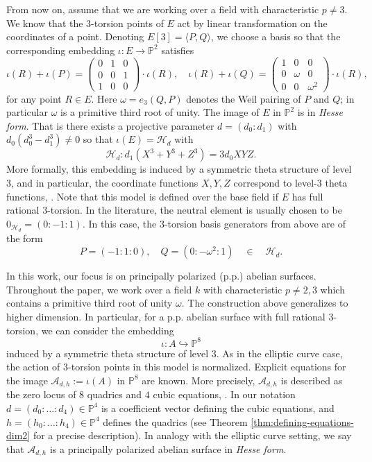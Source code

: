 \documentclass[11pt]{amsart}
\theoremstyle{definition}
\newcommand{\A}{\mathcal{A}}
\renewcommand{\H}{\mathcal{H}}
\newcommand{\HH}{\mathcal{H}}
\let \H\HH
\newcommand{\PP}{\mathbb{P}}
\begin{document}
From now on, assume that we are working over a field with characteristic $p \neq 3$.
We know that the $3$-torsion points of $E$ act by linear transformation on the coordinates of a point. Denoting $E[3] = \langle P, Q\rangle$, we choose a basis so that the corresponding embedding $\iota: E \to \PP^2$ satisfies
\[
\iota(R) + \iota(P) = \begin{pmatrix} 0 & 1 & 0\\ 0&0&1\\ 1&0&0 \end{pmatrix} \cdot \iota(R),\quad 
\iota(R) + \iota(Q) = \begin{pmatrix} 1 & 0 & 0\\ 0&\omega&0\\ 0&0&\omega^2 \end{pmatrix} \cdot \iota(R),
\]
for any point $R \in E$. Here $\omega = e_3(Q,P)$ denotes the Weil pairing of $P$ and $Q$; in particular $\omega$ is a primitive third root of unity. The image of $E$ in $\PP^2$ is in {\em Hesse form}. That is there exists a projective parameter $d = (d_0:d_1)$ with $d_0(d_0^3-d_1^3) \neq 0$ so that $\iota(E) = \H_d$ with
\begin{equation} \label{eq:ell-hesse}
    \H_d: d_1(X^3 + Y^3 + Z^3) = 3d_0 XYZ.
\end{equation}
More formally, this embedding is induced by a symmetric theta structure of level $3$, and in particular, the coordinate functions $X,Y,Z$ correspond to level-$3$ theta functions, \cite[Section 5, Case (b)]{mumford1966equations}. Note that this model is defined over the base field if $E$ has full rational $3$-torsion. In the literature, the neutral element is usually chosen to be $0_{\H_d} = (0:-1:1)$. In this case, the $3$-torsion basis generators from above are of the form
\begin{equation} \label{eq:ell-hesse-torsion}
    P = (-1: 1 :0) ,\quad  Q = (0: -\omega^2 : 1) \quad \in \quad \H_{d}.
\end{equation}

In this work, our focus is on principally polarized (p.p.) abelian surfaces. Throughout the paper, we work over a field $k$ with characteristic $p\neq 2,3$ which contains a primitive third root of unity $\omega$.  The construction above generalizes to higher dimension.
In particular, for a p.p. abelian surface with full rational $3$-torsion, we  can consider the embedding  
\[
\iota: A \hookrightarrow \PP^8
\]
induced by a symmetric theta structure of level $3$. As in the elliptic curve case, the action of $3$-torsion points in this model is normalized. Explicit equations for the image $\A_{d,h} := \iota(A)$ in $\PP^8$ are known. More precisely, $\A_{d,h}$ is described as the zero locus of $8$ quadrics and $4$ cubic equations, \cite{gunji2006defining}.  In our notation $d =(d_0: \dots:d_4) \in \PP^4$ is a coefficient vector defining the cubic equations, and $h = (h_0:\dots: h_4) \in \PP^4$ defines the quadrics (see Theorem \ref{thm:defining-equations-dim2} for a precise description). In analogy with the elliptic curve setting, we say that $\A_{d,h}$ is a principally polarized abelian surface in {\em Hesse form}.
\end{document}
